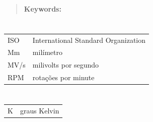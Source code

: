 \documentclass[book,A4paper,10pt,twoside,oldfontcommands]{memoir}\usepackage[]{graphicx}\usepackage[usenames,dvipsnames]{color}
\begin{document}
\begin{abstract}
\vspace{-.75cm}
\noindent\textbf{Keywords:} \Keywords
\end{abstract}
\clearpage

\listoffigures
\clearpage

\listoftables
\clearpage


\chapter*{\hspace{4.8cm}{LISTA DE ABREVIATURAS E SIGLAS}}


\begin{table}[h]
\begin{tabular}{  l  l } 
ISO	&	International Standard Organization\\
Mm	&	milímetro\\
MV/s	&	milivolts por segundo\\
RPM	&	rotações por minute
\end{tabular}
\end{table}



\clearpage


\chapter*{\hspace{6.25cm}{LISTA DE SÍMBOLOS}}


\begin{table}[h]
\begin{tabular}{  l  l } 
K	&	graus Kelvin\\
\end{tabular}
\end{table}
\end{document}
